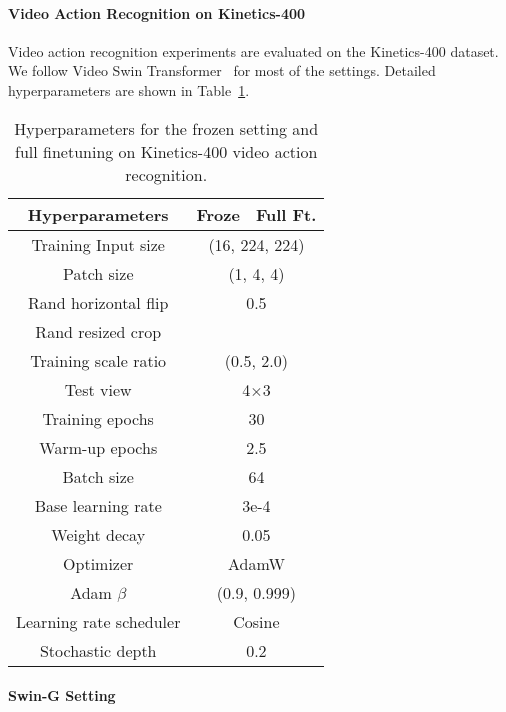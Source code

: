 \documentclass{article}
\newcommand{\cmark}{\text{\ding{51}}}
\begin{document}
\paragraph{Video Action Recognition on Kinetics-400}

Video action recognition experiments are evaluated on the Kinetics-400 dataset. We follow Video Swin Transformer~\cite{liu2021video} for most of the settings. Detailed hyperparameters are shown in Table~\ref{table:setting-video}.

\begin{table}[h]\small
    \centering \begin{tabular}{c|cc}
    \toprule
    \textbf{Hyperparameters} & \textbf{Froze} & \textbf{Full Ft.} \\
    \hline
    Training Input size & \multicolumn{2}{c}{(16, 224, 224)} \\
    Patch size & \multicolumn{2}{c}{(1, 4, 4)} \\
    Rand horizontal flip & \multicolumn{2}{c}{0.5} \\
    Rand resized crop & \multicolumn{2}{c}{\cmark} \\
    Training scale ratio & \multicolumn{2}{c}{(0.5, 2.0)} \\
    Test view & \multicolumn{2}{c}{4$\times$3} \\
    \hline
    Training epochs & \multicolumn{2}{c}{30} \\
    Warm-up epochs & \multicolumn{2}{c}{2.5} \\
    Batch size & \multicolumn{2}{c}{64} \\
    Base learning rate & \multicolumn{2}{c}{3e-4} \\
    Weight decay & \multicolumn{2}{c}{0.05} \\
    Optimizer & \multicolumn{2}{c}{AdamW} \\
    Adam $\beta$ & \multicolumn{2}{c}{(0.9, 0.999)} \\
    Learning rate scheduler & \multicolumn{2}{c}{Cosine} \\
    Stochastic depth & \multicolumn{2}{c}{0.2} \\
    \bottomrule
    \end{tabular}
    \vspace{0.5em}
    \caption{Hyperparameters for the frozen setting and full finetuning on Kinetics-400 video action recognition.}
    \label{table:setting-video}
\end{table}

\paragraph{Swin-G Setting}
\end{document}

